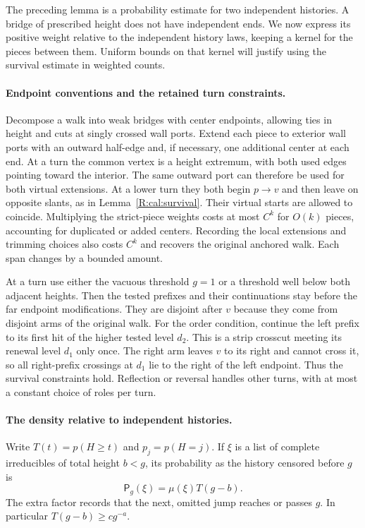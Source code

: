 The preceding lemma is a probability estimate for two independent
histories. A bridge of prescribed height does not have independent ends.
We now express its positive weight relative to the independent history
laws, keeping a kernel for the pieces between them. Uniform bounds on
that kernel will justify using the survival estimate in weighted counts.

\paragraph{Endpoint conventions and the retained turn constraints.}
Decompose a walk into weak bridges with center endpoints, allowing ties
in height and cuts at singly crossed wall ports. Extend each piece to
exterior wall ports with an outward half-edge and, if necessary, one
additional center at each end. At a turn the common vertex is a height
extremum, with both used edges pointing toward the interior. The same
outward port can therefore be used for both virtual extensions. At a
lower turn they both begin $p\to v$ and then leave on opposite slants,
as in Lemma~\ref{R:cal:survival}. Their virtual starts are allowed to
coincide. Multiplying the strict-piece weights costs at most $C^k$ for
$O(k)$ pieces, accounting for duplicated or added centers. Recording the
local extensions and trimming choices also costs $C^k$ and recovers
the original anchored walk. Each span changes by a bounded amount.

At a turn use either the vacuous threshold $g=1$ or a threshold well
below both adjacent heights. Then the tested prefixes and their
continuations stay before the far endpoint modifications. They are
disjoint after $v$ because they come from disjoint arms of the original
walk. For the order condition, continue the left prefix to its first
hit of the higher tested level $d_2$. This is a strip crosscut meeting
its renewal level $d_1$ only once. The right arm leaves $v$ to its
right and cannot cross it, so all right-prefix crossings at $d_1$ lie
to the right of the left endpoint. Thus the survival constraints hold.
Reflection or reversal handles other turns, with at most a constant
choice of roles per turn.

\paragraph{The density relative to independent histories.}
Write $T(t)=p(H\ge t)$ and $p_j=p(H=j)$. If $\xi$ is a list of
complete irreducibles of total height $b<g$, its probability as the
history censored before $g$ is
\[
 \mathsf P_g(\xi)=\mu(\xi)T(g-b).
\]
The extra factor records that the next, omitted jump reaches or passes
$g$. In particular $T(g-b)\ge c g^{-a}$.

